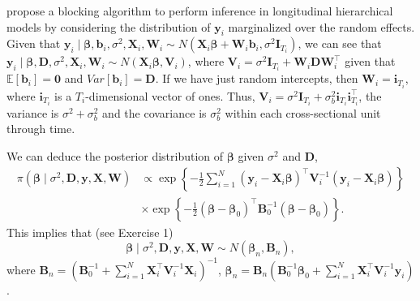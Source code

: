 \cite{Chib1999} propose a blocking algorithm to perform inference in longitudinal hierarchical models by considering the distribution of $\bm{y}_i$ marginalized over the random effects. Given that $\bm{y}_i\mid  \bm{\beta},\bm{b}_i,\sigma^2,\bm{X}_i,\bm{W}_i\sim N(\bm{X}_i\bm{\beta}+\bm{W}_i\bm{b}_i,\sigma^2\bm{I}_{T_i})$, we can see that    $\bm{y}_i\mid \bm{\beta},\bm{D},\sigma^2,\bm{X}_i,\bm{W}_i\sim{N}(\bm{X}_i\bm{\beta},\bm{V}_i)$, where $\bm{V}_i=\sigma^2\bm{I}_{T_i}+\bm{W}_i\bm{D}\bm{W}_i^{\top}$ given that $\mathbb{E}[\bm{b}_i]=\bm{0}$ and $Var[\bm{b}_i]=\bm{D}$. If we have just random intercepts, then $\bm{W}_i=\bm{i}_{T_i}$, where $\bm{i}_{T_i}$ is a $T_i$-dimensional vector of ones. Thus, $\bm{V}_i=\sigma^2\bm{I}_{T_i}+\sigma_{b}^2\bm{i}_{T_i}\bm{i}_{T_i}^{\top}$, the variance is $\sigma^2+\sigma^2_{b}$ and the covariance is $\sigma^2_{b}$ within each cross-sectional unit through time.

We can deduce the posterior distribution of $\bm{\beta}$ given $\sigma^2$ and $\bm{D}$,
\begin{align*}
	\pi(\bm{\beta}\mid \sigma^2, \bm{D},\bm{y}, \bm{X}, \bm{W}) & \propto \exp\left\{-\frac{1}{2}\sum_{i=1}^N(\bm{y}_i-\bm{X}_i\bm{\beta})^{\top}\bm{V}_i^{-1}(\bm{y}_i-\bm{X}_i\bm{\beta})\right\}\\
	&\times \exp\left\{-\frac{1}{2}(\bm{\beta}-\bm{\beta}_0)^{\top}\bm{B}_0^{-1}(\bm{\beta}-\bm{\beta}_0)\right\}.
\end{align*} 
This implies that (see Exercise 1)  
\begin{equation*}
	\bm{\beta}\mid \sigma^2,\bm{D},\bm{y}, \bm{X}, \bm{W} \sim {N}(\bm{\beta}_n,\bm{B}_n), 
\end{equation*}
where $\bm{B}_n = (\bm{B}_0^{-1} +\sum_{i=1}^N \bm{X}_i^{\top}\bm{V}_i^{-1}\bm{X}_i)^{-1}$, $\bm{\beta}_n= \bm{B}_n(\bm{B}_0^{-1}\bm{\beta}_0 + \sum_{i=1}^N\bm{X}_i^{\top}\bm{V}_i^{-1}\bm{y}_i)$.

